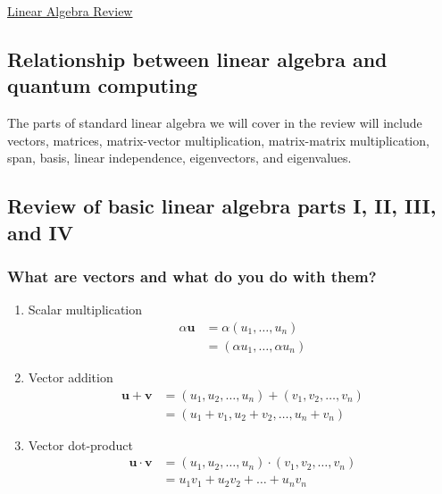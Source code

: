 \documentclass[main.tex]{subfiles}
\begin{document}
\href{https://www2.seas.gwu.edu/~simhaweb/quantum/modules/review/lin-review/lin-review.html}{Linear Algebra Review}

\subsection{Relationship between linear algebra and quantum computing}

The parts of standard linear algebra we will cover in the review will include vectors, matrices, matrix-vector multiplication, matrix-matrix multiplication, span, basis, linear independence, eigenvectors, and eigenvalues.

\subsection{Review of basic linear algebra parts I, II, III, and IV}
    
    \subsubsection{What are vectors and what do you do with them?}
    
    \begin{enumerate}[]
        \item Scalar multiplication $$\begin{aligned} \alpha \mathbf{u} &=\alpha\left(u_{1}, \ldots, u_{n}\right) \\ &=\left(\alpha u_{1}, \ldots, \alpha u_{n}\right) \end{aligned}$$
        
        \item Vector addition $$\begin{aligned} \mathbf{u}+\mathbf{v} &=\left(u_{1}, u_{2}, \ldots, u_{n}\right)+\left(v_{1}, v_{2}, \ldots, v_{n}\right) \\ &= \left(u_{1}+v_{1}, u_{2}+v_{2}, \ldots, u_{n}+v_{n}\right) \end{aligned}$$
        
        \item Vector dot-product $$\begin{aligned} \mathbf{u} \cdot \mathbf{v} &=\left(u_{1}, u_{2}, \ldots, u_{n}\right) \cdot\left(v_{1}, v_{2}, \ldots, v_{n}\right) \\ &=u_{1} v_{1}+u_{2} v_{2}+\ldots+u_{n} v_{n} \end{aligned}$$
    \end{enumerate}
    
\end{document}
